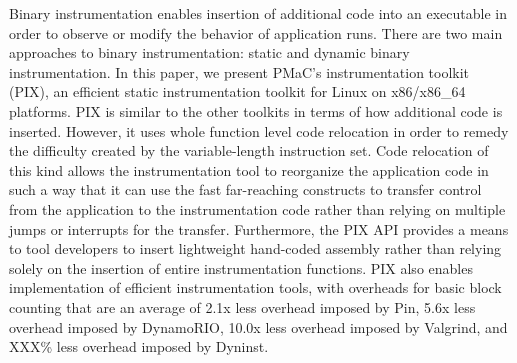 \begin{it}

Binary instrumentation enables insertion of additional code into an
executable in order to observe or modify the behavior of application runs. 
There are two main approaches to binary instrumentation: static and dynamic
binary instrumentation. In this paper, we present PMaC's instrumentation toolkit (PIX), 
an efficient static  instrumentation toolkit for Linux on x86/x86\_64 platforms. PIX
is similar to the other toolkits in terms of how additional code is inserted. However, it uses whole function level
code relocation in order to remedy the difficulty created by the variable-length instruction set. Code relocation of this kind allows the
instrumentation tool to reorganize the application code in such a way that it
can use the fast  far-reaching constructs to transfer control
from the application to the instrumentation code rather than relying on multiple
jumps or interrupts for the transfer. Furthermore, the PIX API provides a means to
tool developers to insert lightweight hand-coded assembly
rather than relying solely on the insertion of entire instrumentation functions.
PIX also enables implementation of efficient instrumentation tools, 
with overheads  for basic block counting that are an
average of 2.1x less overhead imposed by Pin, 5.6x less overhead imposed by
DynamoRIO, 10.0x less overhead imposed by Valgrind, and XXX\% less overhead imposed by Dyninst.

\end{it}
